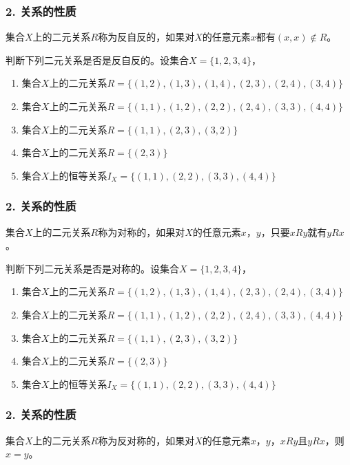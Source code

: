 \documentclass{beamer}
\begin{document}
\begin{CJK*}{UTF8}{gbsn}
\begin{frame}
  \frametitle{2. 关系的性质}
  \begin{Def}
   集合$X$上的二元关系$R$称为\alert{反自反}的，如果对$X$的任意元素$x$都有$(x,x) \notin R$。
 \end{Def}
   \pause
    判断下列二元关系是否是反自反的。设集合$X=\{1,2,3,4\}$，
  \begin{enumerate}
  \item 集合$X$上的二元关系$R=\{(1,2), (1,3), (1,4), (2,3),
    (2,4), (3,4)\}$
  \item 集合$X$上的二元关系$R=\{(1,1), (1,2), (2,2),
    (2,4), (3,3), (4,4)\}$
  \item 集合$X$上的二元关系$R = \{(1,1), (2,3), (3,2)\}$
  \item 集合$X$上的二元关系$R = \{(2,3)\}$
  \item 集合$X$上的恒等关系$I_X = \{(1,1), (2,2), (3,3),(4,4)\}$
  \end{enumerate}
\end{frame}
\begin{frame}
  \frametitle{2. 关系的性质}
  \begin{Def}
    集合$X$上的二元关系$R$称为\alert{对称}的，如果对$X$的任意元素$x$，$y$，只要$xRy$就有$yRx$。
  \end{Def}
    \pause
    判断下列二元关系是否是对称的。设集合$X=\{1,2,3,4\}$，
  \begin{enumerate}
  \item 集合$X$上的二元关系$R=\{(1,2), (1,3), (1,4), (2,3),
    (2,4), (3,4)\}$
  \item 集合$X$上的二元关系$R=\{(1,1), (1,2), (2,2),
    (2,4), (3,3), (4,4)\}$
  \item 集合$X$上的二元关系$R = \{(1,1), (2,3), (3,2)\}$
  \item 集合$X$上的二元关系$R = \{(2,3)\}$
  \item 集合$X$上的恒等关系$I_X = \{(1,1), (2,2), (3,3),(4,4)\}$
  \end{enumerate}
\end{frame}
\begin{frame}
  \frametitle{2. 关系的性质}
  \begin{Def}
         集合$X$上的二元关系$R$称为\alert{反对称}的，如果对$X$的任意元素$x$，$y$，$xRy$且$yRx$，则$x=y$。    
       \end{Def}
         \pause

\end{frame}
\end{CJK*}
\end{document}
